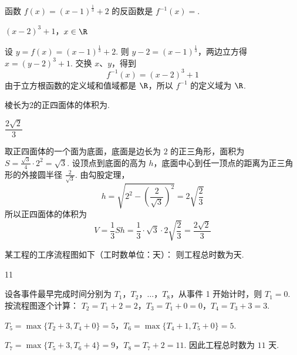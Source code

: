 \documentclass[UTF8,a4paper,oneside,11pt]{ctexbook}
\begin{document}
\begin{problem}
函数 \(f(x)=(x-1)^{\frac{1}{3}}+2 \) 的反函数是 \(f^{-1}(x)= \)\fillinblank{}.
\end{problem}

\begin{answer}
\((x-2)^3+1\)，\(x\in\R\)
\end{answer}

\begin{solution}
设 \(y=f(x)=(x-1)^{\frac{1}{3}}+2\). 则
\(y-2=(x-1)^{\frac{1}{3}}\)，两边立方得 \(x=(y-2)^3+1\).
交换 \(x\)、\(y\)，得到
\[
f^{-1}(x)=(x-2)^3+1
\]
由于立方根函数的定义域和值域都是 \(\R\)，所以 \(f^{-1}\) 的定义域为 \(\R\).
\end{solution}

\begin{problem}
棱长为\(2\)的正四面体的体积为\fillinblank{}.
\end{problem}

\begin{answer}
\(\dfrac{2\sqrt{2}}{3}\)
\end{answer}

\begin{solution}
取正四面体的一个面为底面，底面是边长为 \(2\) 的正三角形，面积为
\(S=\frac{\sqrt3}{4}\cdot2^2=\sqrt3\). 设顶点到底面的高为 \(h\)，底面中心到任一顶点的距离为正三角形的外接圆半径 \(\frac{2}{\sqrt3}\). 由勾股定理，
\[
h=\sqrt{2^2-\left(\frac{2}{\sqrt3}\right)^2}=2\sqrt{\frac{2}{3}}
\]
所以正四面体的体积为
\[
V=\frac13Sh=\frac13\cdot\sqrt3\cdot2\sqrt{\frac23}=\frac{2\sqrt2}{3}
\]
\end{solution}

\begin{problem}
某工程的工序流程图如下（工时数单位：天）：
则工程总时数为\fillinblank{}\(\text{天}\).

\end{problem}

\begin{answer}
11
\end{answer}

\begin{solution}
设各事件最早完成时间分别为 \(T_1\)，\(T_2\)，\(\ldots\)，\(T_8\)，从事件 1 开始计时，则 \(T_1=0\). 按流程图逐个计算：
\(T_2=T_1+2=2\)，\(T_3=T_1+0=0\)，\(T_4=T_3+3=3\).

\(T_5=\max\{T_2+3,T_4+0\}=5\)，\(T_6=\max\{T_4+1,T_5+0\}=5\).

\(T_7=\max\{T_5+3,T_6+4\}=9\)，\(T_8=T_7+2=11\).
因此工程总时数为 \(11\) 天.
\end{solution}
\end{document}
